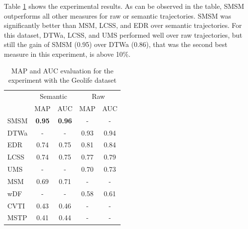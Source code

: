 \documentclass[12pt]{article}
\begin{document}
Table \ref{tab:geolife_measures_map_auc} shows the experimental results. As can be observed in the table, SMSM outperforms all other measures for raw or semantic trajectories. SMSM was significantly better than MSM, LCSS, and EDR over semantic trajectories. For this dataset, DTWa, LCSS, and UMS performed well over raw trajectories, but still the gain of SMSM (0.95) over DTWa (0.86), that was the second best measure in this experiment, is above 10\%.


\begin{table}[ht!]
  \scriptsize
  \centering
  \begin{tabular}{|l|c|c|c|c|}
  	\hline
 & \multicolumn{2}{c}{Semantic}& \multicolumn{2}{|c|}{Raw}\\
 	\cline{2-5}
 & MAP & AUC & MAP & AUC\\
  	\hline
SMSM & \textbf{0.95} & \textbf{0.96} & - & -\\
DTWa & - & - & 0.93 & 0.94\\
 EDR & 0.74 & 0.75 & 0.81 & 0.84\\
LCSS & 0.74 & 0.75 & 0.77 & 0.79\\
 UMS & - & - & 0.70 & 0.73\\
 MSM & 0.69 & 0.71 & - & -\\
 wDF & - & - & 0.58 & 0.61\\
CVTI & 0.43 & 0.46 & - & -\\
MSTP & 0.41 & 0.44 & - & -\\
    \hline
  \end{tabular}
  \caption{MAP and AUC evaluation for the experiment with the Geolife dataset}
  \label{tab:geolife_measures_map_auc}
\end{table}
\end{document}

